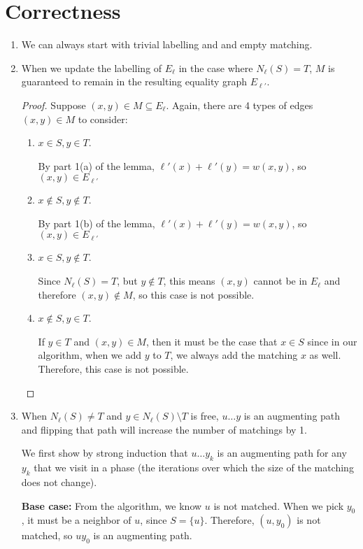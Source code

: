 \documentclass[12pt]{article}
\begin{document}
\section*{Correctness}
\begin{enumerate}
  \item We can always start with trivial labelling and and empty matching.
  \item When we update the labelling of $E_\ell$ in the case where $N_\ell(S) = T$, $M$ is guaranteed to remain in the resulting equality graph $E_{\ell'}$.
  \begin{proof}
    Suppose $(x,y) \in M \subseteq E_\ell$. Again, there are 4 types of edges $(x,y) \in M$ to consider:
    \begin{enumerate}
      \item $x \in S, y \in T$.

      By part 1(a) of the lemma, $\ell'(x) + \ell'(y) = w(x,y)$, so $(x,y) \in E_{\ell'}$
      \item $x \notin S, y \notin T$.

      By part 1(b) of the lemma, $\ell'(x) + \ell'(y) = w(x,y)$, so $(x,y) \in E_{\ell'}$
      \item $x \in S, y \notin T$.

      Since $N_\ell(S) = T$, but $y \notin T$, this means $(x,y)$ cannot be in $E_\ell$ and therefore $(x,y) \notin M$, so this case is not possible.
      \item $x \notin S, y \in T$.

      If $y \in T$ and $(x,y) \in M$, then it must be the case that $x \in S$ since in our algorithm, when we add $y$ to $T$, we always add the matching $x$ as well. Therefore, this case is not possible.
    \end{enumerate}
  \end{proof}

  \item When $N_\ell(S) \neq T$ and $y \in N_\ell(S) \setminus T$ is free, $u \ldots y$ is an augmenting path and flipping that path will increase the number of matchings by 1.

  We first show by strong induction that $u \ldots y_k$ is an augmenting path for any $y_k$ that we visit in a phase (the iterations over which the size of the matching does not change).

  \textbf{Base case: }From the algorithm, we know $u$ is not matched. When we pick $y_0$, it must be a neighbor of $u$, since $S = \{u\}$. Therefore, $(u, y_0)$ is not matched, so $uy_0$ is an augmenting path.


\end{enumerate}
\end{document}
